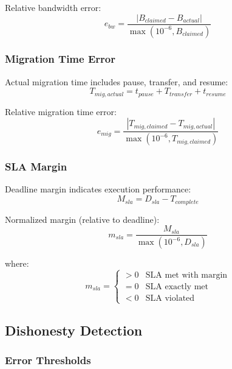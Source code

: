 \documentclass[12pt,a4paper]{article}
\begin{document}
Relative bandwidth error:
\begin{equation}
    e_{bw} = \frac{|B_{claimed} - B_{actual}|}{\max(10^{-6}, B_{claimed})}
\end{equation}

\subsubsection{Migration Time Error}

Actual migration time includes pause, transfer, and resume:
\begin{equation}
    T_{mig,actual} = t_{pause} + T_{transfer} + t_{resume}
\end{equation}

Relative migration time error:
\begin{equation}
    e_{mig} = \frac{|T_{mig,claimed} - T_{mig,actual}|}{\max(10^{-6}, T_{mig,claimed})}
\end{equation}

\subsubsection{SLA Margin}

Deadline margin indicates execution performance:
\begin{equation}
    M_{sla} = D_{sla} - T_{complete}
\end{equation}

Normalized margin (relative to deadline):
\begin{equation}
    m_{sla} = \frac{M_{sla}}{\max(10^{-6}, D_{sla})}
\end{equation}

where:
\begin{equation}
    m_{sla} = \begin{cases}
        > 0 & \text{SLA met with margin} \\
        = 0 & \text{SLA exactly met} \\
        < 0 & \text{SLA violated}
    \end{cases}
\end{equation}

\subsection{Dishonesty Detection}

\subsubsection{Error Thresholds}
\end{document}
